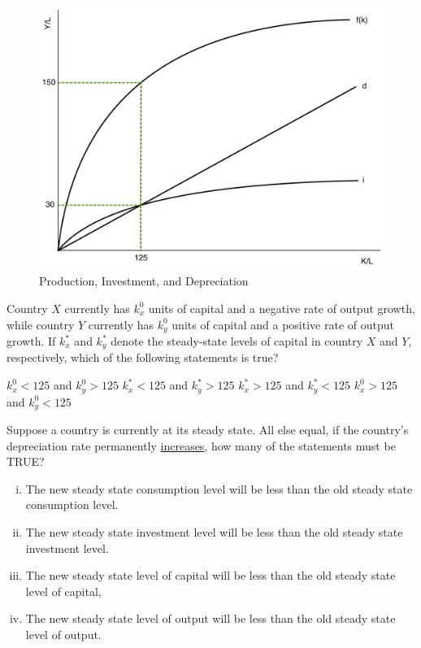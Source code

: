 \documentclass[addpoints,11pt]{exam}
\theoremstyle{definition}
\begin{document}
\begin{questions}
\begin{figure}[H]
	\centering
	\includegraphics[scale=.35]{Final_MC22.pdf}
	\caption{Production, Investment, and Depreciation}
	\label{MC22}
\end{figure}

Country $X$ currently has $k^0_x$ units of capital and a negative rate of output growth, while country $Y$ currently has $k^0_y$ units of capital and a positive rate of output growth. If $k^*_x$ and $k_y^*$ denote the steady-state levels of capital in country $X$ and $Y$, respectively, which of the following statements is true?

\begin{choices}
	\choice $k^0_x < 125$ and $k^0_y > 125$
	\choice $k^*_x < 125$ and $k^*_y > 125$
	\choice $k^*_x > 125$ and $k^*_y < 125$
	\CorrectChoice $k^0_x > 125$ and $k^0_y < 125$
\end{choices}

\question Suppose a country is currently at its steady state. All else equal, if the country's depreciation rate permanently \underline{increases}, how many of the statements must be TRUE?


\begin{enumerate}[i.]
	\item The new steady state consumption level will be less than the old steady state consumption level.
	\item The new steady state investment level will be less than the old steady state investment level.
	\item The new steady state level of capital will be less than the old steady state level of capital,
	\item The new steady state level of output will be less than the old steady state level of output.
\end{enumerate}


\end{questions}
\end{document}
